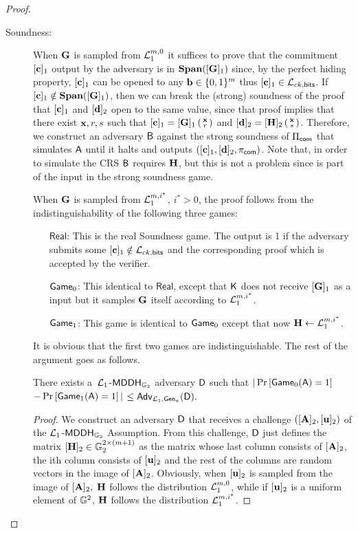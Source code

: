\begin{proof}
\begin{description}
\item[Soundness:] When $\mathbf{{G}}$ is sampled from $\mathcal{L}_1^{m,0}$ it suffices to prove that the commitment $[\mathbf{c}]_1$ output by the adversary is in $\mathbf{Span}([\mathbf{{G}}]_1)$ since, by the perfect hiding property, $[\mathbf{c}]_1$ can be opened to any $\mathbf{b}\in\{0,1\}^m$ thus $[\mathbf{c}]_1\in\mathcal{L}_{ck,\mathsf{bits}}$. If $[\mathbf{c}]_1\notin\mathbf{Span}([\mathbf{{G}}]_1)$, then we can break the (strong) soundness of the proof that $[\mathbf{c}]_1$ and $[\mathbf{d}]_2$ open to the same value, since that proof implies that there exist $\mathbf{x},r,s$ such that $[\mathbf{c}]_1=[\mathbf{{G}}]_1\left(\begin{smallmatrix}\mathbf{x}\\r\end{smallmatrix}\right)$ and $[\mathbf{d}]_2=[\mathbf{{H}}]_2\left(\begin{smallmatrix}\mathbf{x}\\s\end{smallmatrix}\right)$. Therefore, we construct an adversary $\mathsf{B}$ against the strong soundness of $\Pi_{\mathsf{com}}$ that simulates $\mathsf{A}$ until it halts and outputs $([\mathbf{c}]_1,[\mathbf{d}]_2,\pi_{\mathsf{com}})$. Note that, in order to simulate the CRS $\mathsf{B}$ requires $\mathbf{{H}}$, but this is not a problem since is part of the input in the strong soundness game.
 
When $\mathbf{{G}}$ is sampled from $\mathcal{L}_1^{m,i^*}$, ${i^*}>0$, the proof follows from the indistinguishability of the following three games:
\begin{itemize}
\item[$\mathsf{Real}$:] This is the real Soundness game. The output is 1 if the adversary submits some $[\mathbf{c}]_1\notin\mathcal{L}_{ck,\mathsf{bits}}$ and the corresponding proof which is accepted by the verifier.
\item[$\mathsf{Game}_0$:] This identical to $\mathsf{Real}$, except that $\mathsf{K}$ does not receive $[\mathbf{{G}}]_1$ as a input but
it samples $\mathbf{{G}}$ itself according to $\mathcal{L}_1^{m,i^*}$.
\item[$\mathsf{Game}_1$:] This game is identical to $\mathsf{Game}_0$ except that now $\mathbf{{H}}\gets\mathcal{L}_1^{m,i^*}$.
\end{itemize}

It is obvious that the first two games are indistinguishable. The rest of the argument goes as follows.

\begin{lemma} There exists a\ $\mathcal{L}_1$-$\mathsf{MDDH}_{\mathbb{G}_2}$ adversary $\mathsf{D}$ such that
$|\Pr\left[\mathsf{Game}_{0}(\mathsf{A})=1\right]$ $-\Pr\left[\mathsf{Game}_{1}(\mathsf{A})=1\right]|$ $\leq \mathsf{Adv}_{\mathcal{L}_1,\mathsf{Gen}_a}(\mathsf{D}).$
\end{lemma}
\begin{proof}
We construct an adversary $\mathsf{D}$ that receives 
a challenge $([\mathbf{{A}}]_2,[\mathbf{u}]_2)$ of the 
$\mathcal{L}_1$-$\mathsf{MDDH}_{\mathbb{G}_2}$ Assumption. From this challenge, $\mathsf{D}$ just defines the matrix  $[\mathbf{{H}}]_2\in\mathbb{G}_2^{2\times(m+1)}$ as the matrix whose last column consists of $[\mathbf{{A}}]_2$, the ith column consists of $[\mathbf{u}]_2$ and the rest of the columns are random vectors in the image of $[\mathbf{{A}}]_2$. 
Obviously, when $[\mathbf{u}]_2$ is sampled from 
the image of $[\mathbf{{A}}]_2,$ $\mathbf{{H}}$ follows the distribution $\mathcal{L}_1^{m,0}$, while if $[\mathbf{u}]_2$ is a uniform element of $\mathbb{G}^2$, $\mathbf{{H}}$ follows the distribution $\mathcal{L}_1^{m,i^*}$. 
 

\end{proof}
\end{description}
\end{proof}
